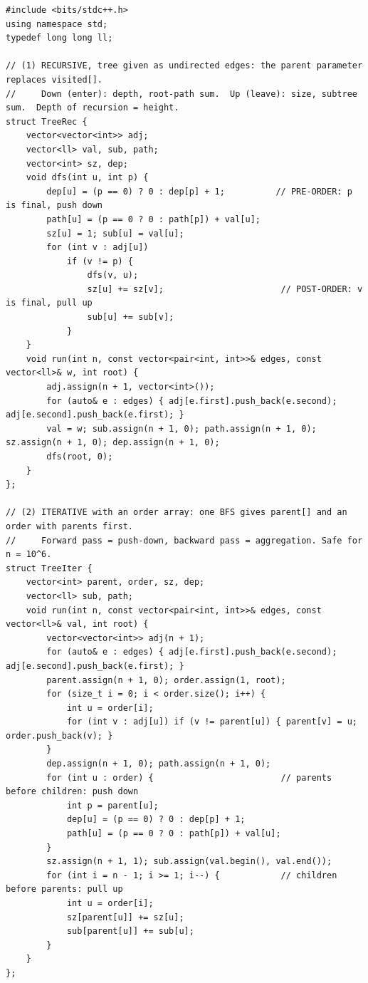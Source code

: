 \begin{lstlisting}[style=cpp]
#include <bits/stdc++.h>
using namespace std;
typedef long long ll;

// (1) RECURSIVE, tree given as undirected edges: the parent parameter replaces visited[].
//     Down (enter): depth, root-path sum.  Up (leave): size, subtree sum.  Depth of recursion = height.
struct TreeRec {
    vector<vector<int>> adj;
    vector<ll> val, sub, path;
    vector<int> sz, dep;
    void dfs(int u, int p) {
        dep[u] = (p == 0) ? 0 : dep[p] + 1;          // PRE-ORDER: p is final, push down
        path[u] = (p == 0 ? 0 : path[p]) + val[u];
        sz[u] = 1; sub[u] = val[u];
        for (int v : adj[u])
            if (v != p) {
                dfs(v, u);
                sz[u] += sz[v];                       // POST-ORDER: v is final, pull up
                sub[u] += sub[v];
            }
    }
    void run(int n, const vector<pair<int, int>>& edges, const vector<ll>& w, int root) {
        adj.assign(n + 1, vector<int>());
        for (auto& e : edges) { adj[e.first].push_back(e.second); adj[e.second].push_back(e.first); }
        val = w; sub.assign(n + 1, 0); path.assign(n + 1, 0); sz.assign(n + 1, 0); dep.assign(n + 1, 0);
        dfs(root, 0);
    }
};

// (2) ITERATIVE with an order array: one BFS gives parent[] and an order with parents first.
//     Forward pass = push-down, backward pass = aggregation. Safe for n = 10^6.
struct TreeIter {
    vector<int> parent, order, sz, dep;
    vector<ll> sub, path;
    void run(int n, const vector<pair<int, int>>& edges, const vector<ll>& val, int root) {
        vector<vector<int>> adj(n + 1);
        for (auto& e : edges) { adj[e.first].push_back(e.second); adj[e.second].push_back(e.first); }
        parent.assign(n + 1, 0); order.assign(1, root);
        for (size_t i = 0; i < order.size(); i++) {
            int u = order[i];
            for (int v : adj[u]) if (v != parent[u]) { parent[v] = u; order.push_back(v); }
        }
        dep.assign(n + 1, 0); path.assign(n + 1, 0);
        for (int u : order) {                         // parents before children: push down
            int p = parent[u];
            dep[u] = (p == 0) ? 0 : dep[p] + 1;
            path[u] = (p == 0 ? 0 : path[p]) + val[u];
        }
        sz.assign(n + 1, 1); sub.assign(val.begin(), val.end());
        for (int i = n - 1; i >= 1; i--) {            // children before parents: pull up
            int u = order[i];
            sz[parent[u]] += sz[u];
            sub[parent[u]] += sub[u];
        }
    }
};


\end{lstlisting}
